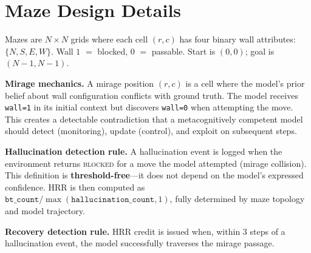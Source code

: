 \documentclass{article}
\begin{document}
\section{Maze Design Details}
\label{sec:maze}

Mazes are $N{\times}N$ grids where each cell $(r, c)$ has four binary wall attributes: $\{N, S, E, W\}$.
Wall $1$ $=$ blocked, $0$ $=$ passable.
Start is $(0,0)$; goal is $(N{-}1, N{-}1)$.

\textbf{Mirage mechanics.}
A mirage position $(r, c)$ is a cell where the model's prior belief about wall configuration conflicts with ground truth.
The model receives \texttt{wall=1} in its initial context but discovers \texttt{wall=0} when attempting the move.
This creates a detectable contradiction that a metacognitively competent model should detect (monitoring), update (control), and exploit on subsequent steps.

\textbf{Hallucination detection rule.}
A hallucination event is logged when the environment returns \textsc{blocked} for a move the model attempted (mirage collision). This definition is \textbf{threshold-free}---it does not depend on the model's expressed confidence. HRR is then computed as $\texttt{bt\_count} / \max(\texttt{hallucination\_count}, 1)$, fully determined by maze topology and model trajectory.

\textbf{Recovery detection rule.}
HRR credit is issued when, within 3 steps of a hallucination event, the model successfully traverses the mirage passage.
\end{document}
